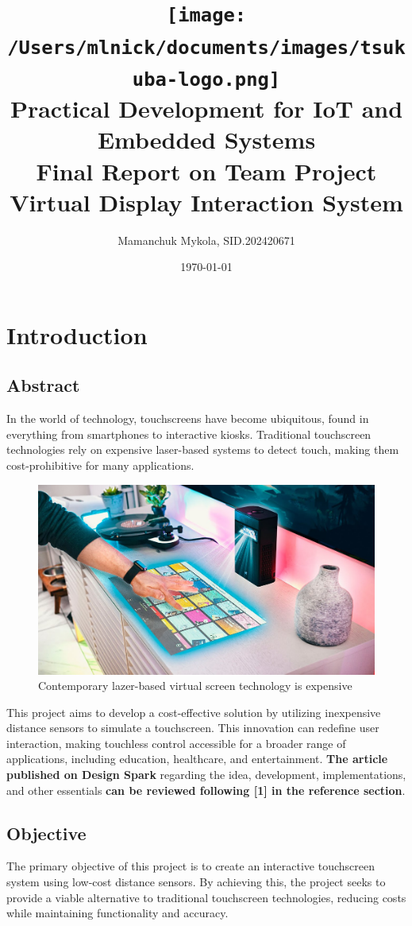 \documentclass[12pt,a4paper]{article}
\title{
    \texttt{[image: /Users/mlnick/documents/images/tsukuba-logo.png]} \\
    \vspace{2mm}
    \textbf{Practical Development for IoT and Embedded Systems} \\
    \vspace{3mm}    
    Final Report on Team Project \\
    Virtual Display Interaction System
}
\author{Mamanchuk Mykola, SID.202420671}
\date{\today}
\begin{document}
\maketitle

\section{Introduction}

\subsection{Abstract}
In the world of technology, touchscreens have become ubiquitous, found in everything from smartphones to interactive kiosks. Traditional touchscreen technologies rely on expensive laser-based systems to detect touch, making them cost-prohibitive for many applications. 

\begin{figure}[!htp]
    \centering
    \includegraphics[scale=0.5]{../IoT Materials/article images/0-Expensive-lazer-technology.png}
    \caption{Contemporary lazer-based virtual screen technology is expensive}
\end{figure}

This project aims to develop a cost-effective solution by utilizing inexpensive distance sensors to simulate a touchscreen. This innovation can redefine user interaction, making touchless control accessible for a broader range of applications, including education, healthcare, and entertainment. \textbf{The article published on Design Spark} regarding the idea, development, implementations, and other essentials \textbf{can be reviewed following [1] in the reference section}.

\subsection{Objective}
The primary objective of this project is to create an interactive touchscreen system using low-cost distance sensors. By achieving this, the project seeks to provide a viable alternative to traditional touchscreen technologies, reducing costs while maintaining functionality and accuracy.
\end{document}
